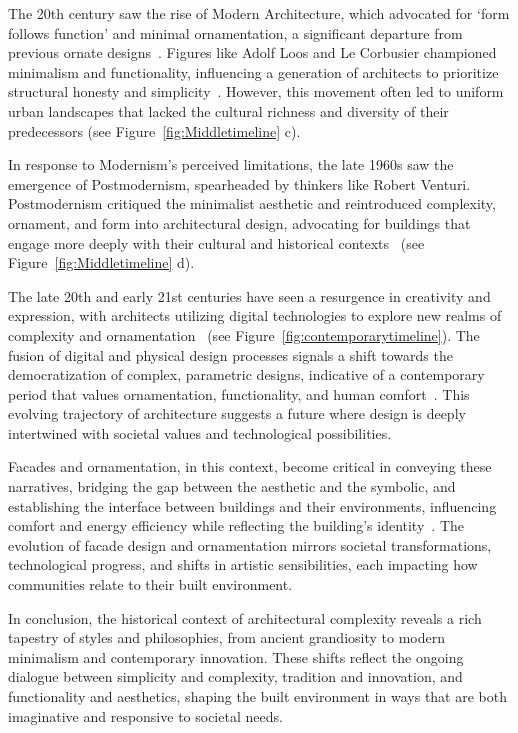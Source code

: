 The 20th century saw the rise of Modern Architecture, which advocated for `form follows function' and minimal ornamentation, a significant departure from previous ornate designs~\cite{Gage2015}.
Figures like Adolf Loos and Le Corbusier championed minimalism and functionality, influencing a generation of architects to prioritize structural honesty and simplicity~\cite{Saglam2014}.
However, this movement often led to uniform urban landscapes that lacked the cultural richness and diversity of their predecessors (see Figure~\ref{fig:Middletimeline} c).

In response to Modernism's perceived limitations, the late 1960s saw the emergence of Postmodernism, spearheaded by thinkers like Robert Venturi.
Postmodernism critiqued the minimalist aesthetic and reintroduced complexity, ornament, and form into architectural design, advocating for buildings that engage more deeply with their cultural and historical contexts~\cite{Venturi1972} (see Figure~\ref{fig:Middletimeline} d).

The late 20th and early 21st centuries have seen a resurgence in creativity and expression, with architects utilizing digital technologies to explore new realms of complexity and ornamentation~\cite{Burlando2019} (see Figure~\ref{fig:contemporarytimeline}).
The fusion of digital and physical design processes signals a shift towards the democratization of complex, parametric designs, indicative of a contemporary period that values ornamentation, functionality, and human comfort~\cite{Schwab2016}.
This evolving trajectory of architecture suggests a future where design is deeply intertwined with societal values and technological possibilities.

Facades and ornamentation, in this context, become critical in conveying these narratives, bridging the gap between the aesthetic and the symbolic, and establishing the interface between buildings and their environments, influencing comfort and energy efficiency while reflecting the building's identity~\cite{Kamal2020}.
The evolution of facade design and ornamentation mirrors societal transformations, technological progress, and shifts in artistic sensibilities, each impacting how communities relate to their built environment.

In conclusion, the historical context of architectural complexity reveals a rich tapestry of styles and philosophies, from ancient grandiosity to modern minimalism and contemporary innovation.
These shifts reflect the ongoing dialogue between simplicity and complexity, tradition and innovation, and functionality and aesthetics, shaping the built environment in ways that are both imaginative and responsive to societal needs.


